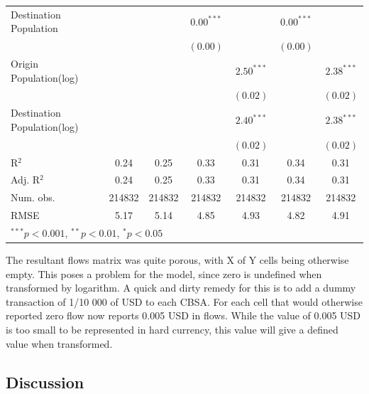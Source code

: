\begin{table}
\begin{center}
\begin{tabular}{l c c c c c c }
			Destination Population      &               &               & $0.00^{***}$  &                & $0.00^{***}$  &                \\
			&               &               & $(0.00)$      &                & $(0.00)$      &                \\
			Origin Population(log)      &               &               &               & $2.50^{***}$   &               & $2.38^{***}$   \\
			&               &               &               & $(0.02)$       &               & $(0.02)$       \\
			Destination Population(log) &               &               &               & $2.40^{***}$   &               & $2.38^{***}$   \\
			&               &               &               & $(0.02)$       &               & $(0.02)$       \\
			\hline
			R$^2$                        & 0.24          & 0.25          & 0.33          & 0.31           & 0.34          & 0.31           \\
			Adj. R$^2$                   & 0.24          & 0.25          & 0.33          & 0.31           & 0.34          & 0.31           \\
			Num. obs.                    & 214832        & 214832        & 214832        & 214832         & 214832        & 214832         \\
			RMSE                         & 5.17          & 5.14          & 4.85          & 4.93           & 4.82          & 4.91           \\
			\hline
			\multicolumn{7}{l}{\scriptsize{$^{***}p<0.001$, $^{**}p<0.01$, $^*p<0.05$}}
		\end{tabular}
		
		\label{table:coefficients_gravity_2013Q2}
	\end{center}
\end{table}

The resultant flows matrix was quite porous, with X of Y cells being otherwise empty.  This poses a problem for the model, since zero is undefined when transformed by logarithm.  A quick and dirty remedy for this is to add a dummy transaction of 1/10 000 of USD to each CBSA.  For each cell that would otherwise reported zero flow now reports 0.005 USD in flows.  While the value of 0.005 USD is too small to be represented in hard currency, this value will give a defined value when transformed.  

\subsection{Discussion}

